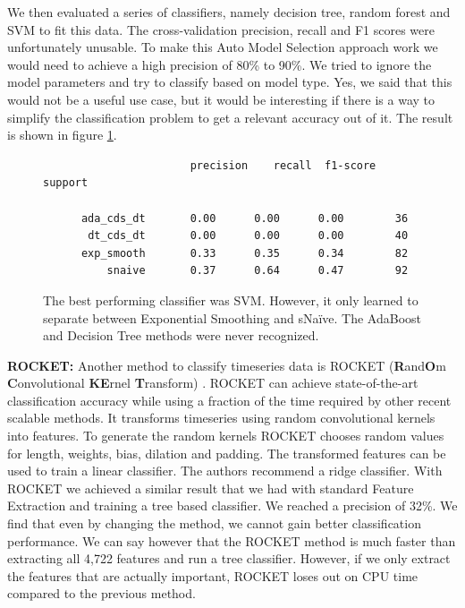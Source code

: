 
We then evaluated a series of classifiers, namely decision tree, random forest and SVM \cite{SVM} to fit this data. The cross-validation precision, recall and F1 scores were unfortunately unusable. To make this Auto Model Selection approach work we would need to achieve a high precision of 80\% to 90\%. We tried to ignore the model parameters and try to classify based on model type. Yes, we said that this would not be a useful use case, but it would be interesting if there is a way to simplify the classification problem to get a relevant accuracy out of it. The result is shown in figure \ref{fig:classifier_metrics}.

\begin{figure}
    \begin{verbatim}
                       precision    recall  f1-score   support
    
      ada_cds_dt       0.00      0.00      0.00        36
       dt_cds_dt       0.00      0.00      0.00        40
      exp_smooth       0.33      0.35      0.34        82
          snaive       0.37      0.64      0.47        92
    \end{verbatim}
    \caption{The best performing classifier was SVM. However, it only learned to separate between Exponential Smoothing and sNa\"ive. The AdaBoost and Decision Tree methods were never recognized.}
    \label{fig:classifier_metrics}
\end{figure}

\textbf{ROCKET:} Another method to classify timeseries data is ROCKET (\textbf{R}and\textbf{O}m \textbf{C}onvolutional \textbf{KE}rnel \textbf{T}ransform) \cite{ROCKET}. ROCKET can achieve state-of-the-art classification accuracy while using a fraction of the time required by other recent scalable methods. It transforms timeseries using random convolutional kernels into features. To generate the random kernels ROCKET chooses random values for length, weights, bias, dilation and padding. The transformed features can be used to train a linear classifier. The authors recommend a ridge classifier. With ROCKET we achieved a similar result that we had with standard Feature Extraction and training a tree based classifier. We reached a precision of 32\%. We find that even by changing the method, we cannot gain better classification performance. We can say however that the ROCKET method is much faster than extracting all 4,722 features and run a tree classifier. However, if we only extract the features that are actually important, ROCKET loses out on CPU time compared to the previous method.



